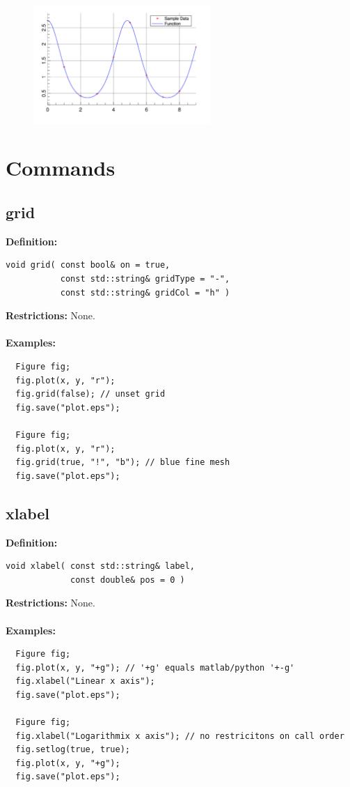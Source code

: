 \documentclass[a4paper]{article}
\newcommand{\command}[1]{\subsection{#1}}
\begin{document}
\begin{figure}[h]
  \centering
  \includegraphics[width=0.6\textwidth]{opening-example.pdf}
  \thispagestyle{empty}
\end{figure}

\restoregeometry
\newpage
\section{Commands}

\command{grid}

\textbf{Definition:}
\begin{lstlisting}
void grid( const bool& on = true, 
           const std::string& gridType = "-", 
           const std::string& gridCol = "h" )
\end{lstlisting}
%
\textbf{Restrictions:} None. \\ \\
%
\textbf{Examples:}
\begin{lstlisting}
  Figure fig;
  fig.plot(x, y, "r");
  fig.grid(false); // unset grid
  fig.save("plot.eps");

  Figure fig;
  fig.plot(x, y, "r");
  fig.grid(true, "!", "b"); // blue fine mesh
  fig.save("plot.eps");
\end{lstlisting}

\command{xlabel}

\textbf{Definition:}
\begin{lstlisting}
void xlabel( const std::string& label, 
             const double& pos = 0 )
\end{lstlisting}
%
\textbf{Restrictions:} None. \\ \\
%
\textbf{Examples:}
\begin{lstlisting}
  Figure fig;
  fig.plot(x, y, "+g"); // '+g' equals matlab/python '+-g'
  fig.xlabel("Linear x axis");
  fig.save("plot.eps");

  Figure fig;
  fig.xlabel("Logarithmix x axis"); // no restricitons on call order
  fig.setlog(true, true);
  fig.plot(x, y, "+g");
  fig.save("plot.eps");
\end{lstlisting}
\end{document}
